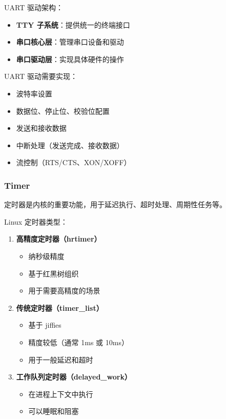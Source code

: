 UART 驱动架构：
\begin{itemize}
  \item \textbf{TTY 子系统}：提供统一的终端接口
  \item \textbf{串口核心层}：管理串口设备和驱动
  \item \textbf{串口驱动层}：实现具体硬件的操作
\end{itemize}

UART 驱动需要实现：
\begin{itemize}
  \item 波特率设置
  \item 数据位、停止位、校验位配置
  \item 发送和接收数据
  \item 中断处理（发送完成、接收数据）
  \item 流控制（RTS/CTS、XON/XOFF）
\end{itemize}

\subsubsection{Timer}

定时器是内核的重要功能，用于延迟执行、超时处理、周期性任务等。

Linux 定时器类型：
\begin{enumerate}
  \item \textbf{高精度定时器（hrtimer）}
    \begin{itemize}
      \item 纳秒级精度
      \item 基于红黑树组织
      \item 用于需要高精度的场景
    \end{itemize}

  \item \textbf{传统定时器（timer\_list）}
    \begin{itemize}
      \item 基于 jiffies
      \item 精度较低（通常 1ms 或 10ms）
      \item 用于一般延迟和超时
    \end{itemize}

  \item \textbf{工作队列定时器（delayed\_work）}
    \begin{itemize}
      \item 在进程上下文中执行
      \item 可以睡眠和阻塞
    \end{itemize}
\end{enumerate}

